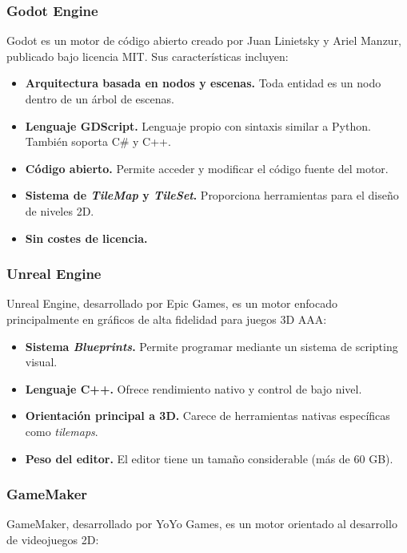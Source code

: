 \subsubsection{Godot Engine}


Godot es un motor de código abierto creado por Juan Linietsky y Ariel Manzur, publicado bajo licencia MIT. Sus características incluyen:

\begin{itemize}
\item \textbf{Arquitectura basada en nodos y escenas.} Toda entidad es un nodo dentro de un árbol de escenas.
\item \textbf{Lenguaje GDScript.} Lenguaje propio con sintaxis similar a Python. También soporta C\# y C++.
\item \textbf{Código abierto.} Permite acceder y modificar el código fuente del motor.
\item \textbf{Sistema de \textit{TileMap} y \textit{TileSet}.} Proporciona herramientas para el diseño de niveles 2D.
\item \textbf{Sin costes de licencia.}
\end{itemize}

\subsubsection{Unreal Engine}


Unreal Engine, desarrollado por Epic Games, es un motor enfocado principalmente en gráficos de alta fidelidad para juegos 3D AAA:

\begin{itemize}
\item \textbf{Sistema \textit{Blueprints}.} Permite programar mediante un sistema de scripting visual.
\item \textbf{Lenguaje C++.} Ofrece rendimiento nativo y control de bajo nivel.
\item \textbf{Orientación principal a 3D.} Carece de herramientas nativas específicas como \textit{tilemaps}.
\item \textbf{Peso del editor.} El editor tiene un tamaño considerable (más de 60 GB).
\end{itemize}

\subsubsection{GameMaker}


GameMaker, desarrollado por YoYo Games, es un motor orientado al desarrollo de videojuegos 2D:

